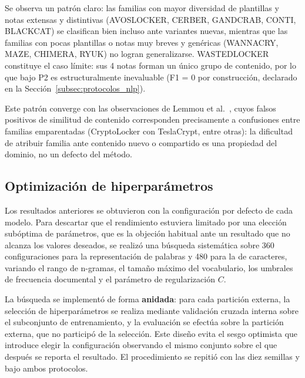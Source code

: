 Se observa un patrón claro: las familias con mayor diversidad de plantillas y notas extensas y distintivas (AVOSLOCKER, CERBER, GANDCRAB, CONTI, BLACKCAT) se clasifican bien incluso ante variantes nuevas, mientras que las familias con pocas plantillas o notas muy breves y genéricas (WANNACRY, MAZE, CHIMERA, RYUK) no logran generalizarse. WASTEDLOCKER constituye el caso límite: sus 4 notas forman un único grupo de contenido, por lo que bajo P2 es estructuralmente inevaluable (F1 = 0 por construcción, declarado en la Sección~\ref{subsec:protocolos_nlp}).

Este patrón converge con las observaciones de Lemmou et al.~\cite{paper_5_note_files}, cuyos falsos positivos de similitud de contenido corresponden precisamente a confusiones entre familias emparentadas (CryptoLocker con TeslaCrypt, entre otras): la dificultad de atribuir familia ante contenido nuevo o compartido es una propiedad del dominio, no un defecto del método.

\subsection{Optimización de hiperparámetros}
\label{subsec:exp3_hiperparametros}

Los resultados anteriores se obtuvieron con la configuración por defecto de cada modelo. Para descartar que el rendimiento estuviera limitado por una elección subóptima de parámetros, que es la objeción habitual ante un resultado que no alcanza los valores deseados, se realizó una búsqueda sistemática sobre 360 configuraciones para la representación de palabras y 480 para la de caracteres, variando el rango de n-gramas, el tamaño máximo del vocabulario, los umbrales de frecuencia documental y el parámetro de regularización $C$.

La búsqueda se implementó de forma \textbf{anidada}: para cada partición externa, la selección de hiperparámetros se realiza mediante validación cruzada interna sobre el subconjunto de entrenamiento, y la evaluación se efectúa sobre la partición externa, que no participó de la selección. Este diseño evita el sesgo optimista que introduce elegir la configuración observando el mismo conjunto sobre el que después se reporta el resultado. El procedimiento se repitió con las diez semillas y bajo ambos protocolos.

